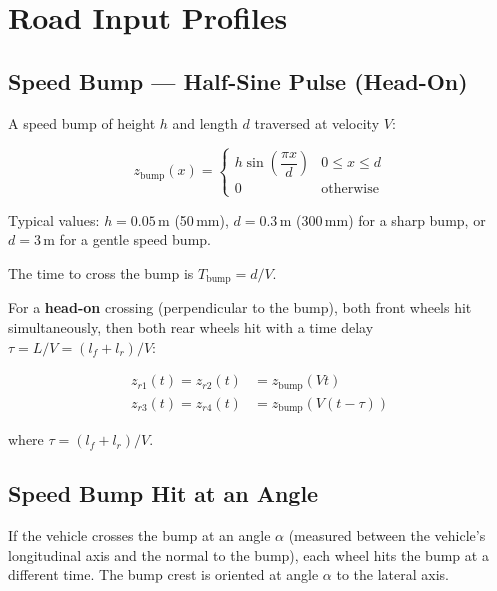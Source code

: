 \documentclass[11pt]{article}
\begin{document}
\section{Road Input Profiles}

\subsection{Speed Bump --- Half-Sine Pulse (Head-On)}

A speed bump of height $h$ and length $d$ traversed at velocity $V$:

\begin{equation}
z_{\text{bump}}(x) = \begin{cases} h\sin\!\left(\dfrac{\pi x}{d}\right) & 0 \le x \le d \\ 0 & \text{otherwise} \end{cases}
\end{equation}

Typical values: $h = 0.05$\,m (50\,mm), $d = 0.3$\,m (300\,mm) for a sharp bump, or $d = 3$\,m for a gentle speed bump.

The time to cross the bump is $T_{\text{bump}} = d/V$.

For a \textbf{head-on} crossing (perpendicular to the bump), both front wheels hit simultaneously, then both rear wheels hit with a time delay $\tau = L/V = (l_f+l_r)/V$:

\begin{align}
z_{r1}(t) = z_{r2}(t) &= z_{\text{bump}}(Vt) \label{eq:bump_front} \\
z_{r3}(t) = z_{r4}(t) &= z_{\text{bump}}(V(t-\tau)) \label{eq:bump_rear}
\end{align}

where $\tau = (l_f + l_r)/V$.

\subsection{Speed Bump Hit at an Angle}

If the vehicle crosses the bump at an angle $\alpha$ (measured between the vehicle's longitudinal axis and the normal to the bump), each wheel hits the bump at a different time. The bump crest is oriented at angle $\alpha$ to the lateral axis.
\end{document}
